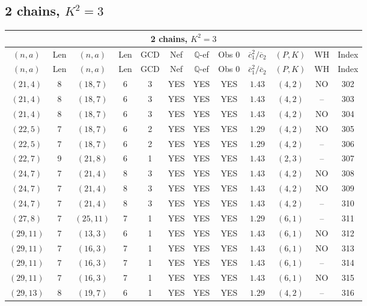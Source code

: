 \subsection{2 chains, $K^2 = 3$}
\begin{longtable}{|c|c|c|c|c|c|c|c|c|c|c|c|}
\hline
\multicolumn{12}{|c|}{2 chains, $K^2 = 3$}\\
\hline
$(n,a)$ & Len & $(n,a)$ & Len & GCD & Nef & $\mathbb Q$-ef & Obs 0 & $\overline c_1^2 / \overline c_2$ & $(P,K)$ & WH & Index\\
\hline
\endfirsthead

\hline
$(n,a)$ & Len & $(n,a)$ & Len & GCD & Nef & $\mathbb Q$-ef & Obs 0 & $\overline c_1^2 / \overline c_2$ & $(P,K)$ & WH & Index\\
\hline
\endhead
\hline
\endfoot

$(21,4)$ & 8 & $(18,7)$ & 6 & 3 & YES & YES & YES & $1.43$ & $(4,2)$ & NO & 302\\
$(21,4)$ & 8 & $(18,7)$ & 6 & 3 & YES & YES & YES & $1.43$ & $(4,2)$ & -- & 303\\
$(21,4)$ & 8 & $(18,7)$ & 6 & 3 & YES & YES & YES & $1.43$ & $(4,2)$ & NO & 304\\
$(22,5)$ & 7 & $(18,7)$ & 6 & 2 & YES & YES & YES & $1.29$ & $(4,2)$ & NO & 305\\
$(22,5)$ & 7 & $(18,7)$ & 6 & 2 & YES & YES & YES & $1.29$ & $(4,2)$ & -- & 306\\
$(22,7)$ & 9 & $(21,8)$ & 6 & 1 & YES & YES & YES & $1.43$ & $(2,3)$ & -- & 307\\
$(24,7)$ & 7 & $(21,4)$ & 8 & 3 & YES & YES & YES & $1.43$ & $(4,2)$ & NO & 308\\
$(24,7)$ & 7 & $(21,4)$ & 8 & 3 & YES & YES & YES & $1.43$ & $(4,2)$ & NO & 309\\
$(24,7)$ & 7 & $(21,4)$ & 8 & 3 & YES & YES & YES & $1.43$ & $(4,2)$ & -- & 310\\
$(27,8)$ & 7 & $(25,11)$ & 7 & 1 & YES & YES & YES & $1.29$ & $(6,1)$ & -- & 311\\
$(29,11)$ & 7 & $(13,3)$ & 6 & 1 & YES & YES & YES & $1.43$ & $(6,1)$ & NO & 312\\
$(29,11)$ & 7 & $(16,3)$ & 7 & 1 & YES & YES & YES & $1.43$ & $(6,1)$ & NO & 313\\
$(29,11)$ & 7 & $(16,3)$ & 7 & 1 & YES & YES & YES & $1.43$ & $(6,1)$ & -- & 314\\
$(29,11)$ & 7 & $(16,3)$ & 7 & 1 & YES & YES & YES & $1.43$ & $(6,1)$ & NO & 315\\
$(29,13)$ & 8 & $(19,7)$ & 6 & 1 & YES & YES & YES & $1.29$ & $(4,2)$ & -- & 316\\

\end{longtable}
